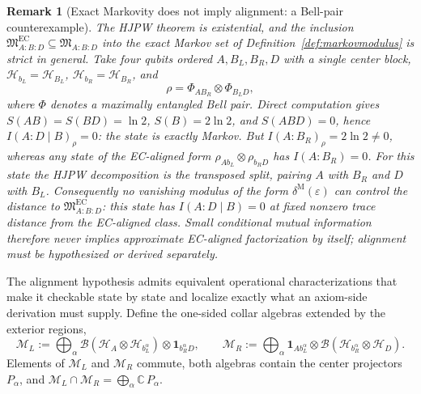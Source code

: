 \documentclass[11pt]{article}
\newtheorem{remark}[theorem]{Remark}
\begin{document}
\begin{remark}[Exact Markovity does not imply alignment: a Bell-pair counterexample]\label{rem:hjpwalignment}
The HJPW theorem is existential, and the inclusion \(\mathfrak M^{\mathrm{EC}}_{A:B:D}\subseteq\mathfrak M_{A:B:D}\) into the exact Markov set of Definition~\ref{def:markovmodulus} is strict in general. Take four qubits ordered \(A,B_L,B_R,D\) with a single center block, \(\mathcal H_{b_L}=\mathcal H_{B_L}\), \(\mathcal H_{b_R}=\mathcal H_{B_R}\), and
\[
\rho=\Phi_{A B_R}\otimes\Phi_{B_L D},
\]
where \(\Phi\) denotes a maximally entangled Bell pair. Direct computation gives \(S(AB)=S(BD)=\ln 2\), \(S(B)=2\ln 2\), and \(S(ABD)=0\), hence \(I(A:D\mid B)_\rho=0\): the state is exactly Markov. But \(I(A:B_R)_\rho=2\ln 2\neq 0\), whereas any state of the EC-aligned form \(\rho_{A b_L}\otimes\rho_{b_R D}\) has \(I(A:B_R)=0\). For this state the HJPW decomposition is the transposed split, pairing \(A\) with \(B_R\) and \(D\) with \(B_L\). Consequently no vanishing modulus of the form \(\delta^{\mathrm M}(\varepsilon)\) can control the distance to \(\mathfrak M^{\mathrm{EC}}_{A:B:D}\): this state has \(I(A:D\mid B)=0\) at fixed nonzero trace distance from the EC-aligned class. Small conditional mutual information therefore never implies approximate EC-aligned factorization by itself; alignment must be hypothesized or derived separately.
\end{remark}

The alignment hypothesis admits equivalent operational characterizations that make it checkable state by state and localize exactly what an axiom-side derivation must supply. Define the one-sided collar algebras extended by the exterior regions,
\[
\mathcal M_L:=\bigoplus_\alpha \mathcal B(\mathcal H_A\otimes\mathcal H_{b_L^\alpha})\otimes\mathbf 1_{b_R^\alpha D},
\qquad
\mathcal M_R:=\bigoplus_\alpha \mathbf 1_{A b_L^\alpha}\otimes\mathcal B(\mathcal H_{b_R^\alpha}\otimes\mathcal H_D).
\]
Elements of \(\mathcal M_L\) and \(\mathcal M_R\) commute, both algebras contain the center projectors \(P_\alpha\), and \(\mathcal M_L\cap\mathcal M_R=\bigoplus_\alpha\mathbb C\,P_\alpha\).
\end{document}
